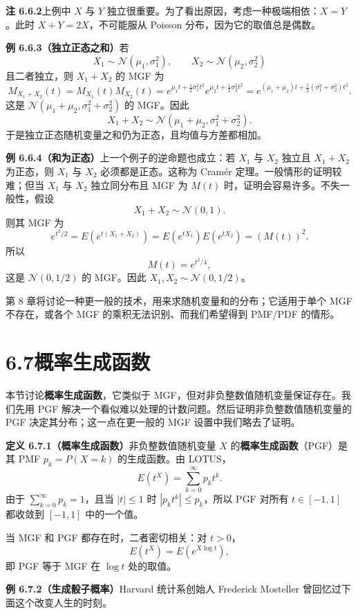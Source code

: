 \documentclass[UTF8, 12pt, fontset=fandol, oneside]{ctexart}
\begin{document}
\noindent\textbf{注 6.6.2}\quad 上例中 $X$ 与 $Y$ 独立很重要。为了看出原因，考虑一种极端相依：$X=Y$。此时 $X+Y=2X$，不可能服从 Poisson 分布，因为它的取值总是偶数。

\noindent\textbf{例 6.6.3（独立正态之和）}\quad 若
\[
  X_1\sim\mathcal{N}(\mu_1,\sigma_1^2),\qquad
  X_2\sim\mathcal{N}(\mu_2,\sigma_2^2)
\]
且二者独立，则 $X_1+X_2$ 的 MGF 为
\[
  M_{X_1+X_2}(t)
  =
  M_{X_1}(t)M_{X_2}(t)
  =
  e^{\mu_1t+\frac12\sigma_1^2t^2}
  e^{\mu_2t+\frac12\sigma_2^2t^2}
  =
  e^{(\mu_1+\mu_2)t+\frac12(\sigma_1^2+\sigma_2^2)t^2}.
\]
这是 $\mathcal{N}(\mu_1+\mu_2,\sigma_1^2+\sigma_2^2)$ 的 MGF。因此
\[
  X_1+X_2\sim\mathcal{N}(\mu_1+\mu_2,\sigma_1^2+\sigma_2^2).
\]
于是独立正态随机变量之和仍为正态，且均值与方差都相加。

\noindent\textbf{例 6.6.4（和为正态）}\quad 上一个例子的逆命题也成立：若 $X_1$ 与 $X_2$ 独立且 $X_1+X_2$ 为正态，则 $X_1$ 与 $X_2$ 必须都是正态。这称为 Cramér 定理。一般情形的证明较难；但当 $X_1$ 与 $X_2$ 独立同分布且 MGF 为 $M(t)$ 时，证明会容易许多。不失一般性，假设
\[
  X_1+X_2\sim\mathcal{N}(0,1).
\]
则其 MGF 为
\[
  e^{t^2/2}
  =
  E(e^{t(X_1+X_2)})
  =
  E(e^{tX_1})E(e^{tX_2})
  =
  (M(t))^2.
\]
所以
\[
  M(t)=e^{t^2/4},
\]
这是 $\mathcal{N}(0,1/2)$ 的 MGF。因此 $X_1,X_2\sim\mathcal{N}(0,1/2)$。

第 8 章将讨论一种更一般的技术，用来求随机变量和的分布；它适用于单个 MGF 不存在，或各个 MGF 的乘积无法识别、而我们希望得到 PMF/PDF 的情形。

\section*{6.7\quad 概率生成函数}

本节讨论\textbf{概率生成函数}，它类似于 MGF，但对非负整数值随机变量保证存在。我们先用 PGF 解决一个看似难以处理的计数问题。然后证明非负整数值随机变量的 PGF 决定其分布；这一点在更一般的 MGF 设置中我们略去了证明。

\noindent\textbf{定义 6.7.1（概率生成函数）}\quad 非负整数值随机变量 $X$ 的\textbf{概率生成函数}（PGF）是其 PMF $p_k=P(X=k)$ 的生成函数。由 LOTUS，
\[
  E(t^X)=\sum_{k=0}^{\infty}p_kt^k.
\]
由于 $\sum_{k=0}^{\infty}p_k=1$，且当 $|t|\le1$ 时 $|p_kt^k|\le p_k$，所以 PGF 对所有 $t\in[-1,1]$ 都收敛到 $[-1,1]$ 中的一个值。

当 MGF 和 PGF 都存在时，二者密切相关：对 $t>0$，
\[
  E(t^X)=E(e^{X\log t}),
\]
即 PGF 等于 MGF 在 $\log t$ 处的取值。

\noindent\textbf{例 6.7.2（生成骰子概率）}\quad Harvard 统计系创始人 Frederick Mosteller 曾回忆过下面这个改变人生的时刻。
\end{document}
